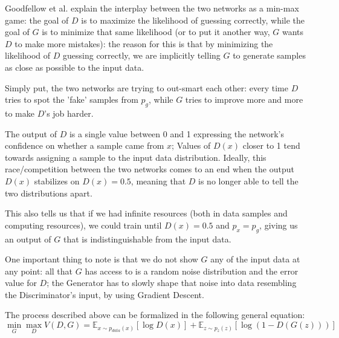 

Goodfellow et al.\cite{Goodfellow2014} explain the interplay between the two networks as a min-max game: the goal of $D$ is to maximize the likelihood of guessing correctly, while the goal of $G$ is to minimize that same likelihood (or to put it another way, $G$ wants $D$ to make more mistakes): the reason for this is that by minimizing the likelihood of $D$ guessing correctly, we are implicitly telling $G$ to generate samples as close as possible to the input data.

Simply put, the two networks are trying to out-smart each other: every time $D$ tries to spot the 'fake' samples from $p_g$, while $G$ tries to improve more and more to make $D$'s job harder.

The output of $D$ is a single value between 0 and 1 expressing the network's confidence on whether a sample came from $x$; Values of $D(x)$ closer to 1 tend towards assigning a sample to the input data distribution.
Ideally, this race/competition between the two networks comes to an end when the output $D(x)$ stabilizes on $D(x)=0.5$, meaning that $D$ is no longer able to tell the two distributions apart.

This also tells us that if we had infinite resources (both in  data samples and computing resources), we could train until $D(x)=0.5$ and $p_x=p_g$, giving us an output of $G$ that is indistinguishable from the input data.

One important thing to note is that we do not show $G$ any of the input data at any point: all that $G$ has access to is a random noise distribution and the error value for $D$; the Generator has to slowly shape that noise into data resembling the Discriminator's input, by using Gradient Descent.  

The process described above can be formalized in the following general equation:
\begin{equation}
 \min\limits_{G} \max\limits_{D} V(D,G)=\mathbb{E}_{x\sim p_{data}(x)}[\log{D(x)}]+\mathbb{E}_{z\sim p_z(z)}[\log{(1-D(G(z)))}] 
\end{equation} 

